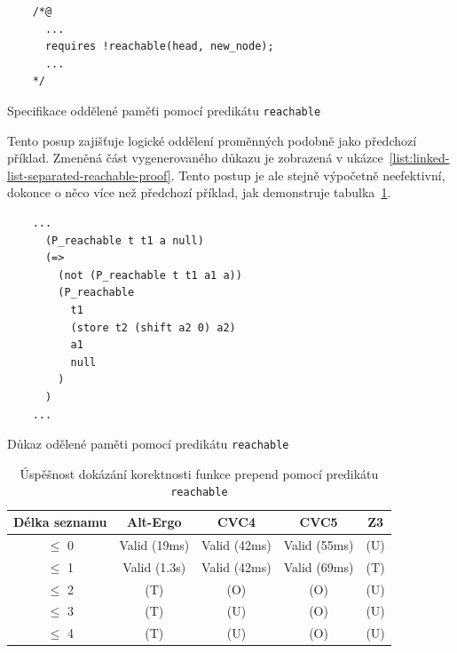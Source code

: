 \begin{listing}[H]
    \begin{verbatim}
    /*@
      ...
      requires !reachable(head, new_node);
      ...
    */
    \end{verbatim}
    \caption{Specifikace oddělené paměťi pomocí predikátu \texttt{reachable}}
    \label{list:linked-list-separated-reachable}
\end{listing}

Tento posup zajišťuje logické oddělení proměnných podobně jako předchozí příklad.
Zmeněná část vygenerovaného důkazu je zobrazená v ukázce~\ref{list:linked-list-separated-reachable-proof}.
Tento postup je ale stejně výpočetně neefektivní, dokonce o něco více než předchozí příklad,
jak demonstruje tabulka~\ref{tab:prepend-smt-success-reachable}.

\begin{listing}[H]
    \begin{verbatim}
    ...
      (P_reachable t t1 a null)
      (=>
        (not (P_reachable t t1 a1 a))
        (P_reachable
          t1
          (store t2 (shift a2 0) a2)
          a1
          null
        )
      )
    ...
    \end{verbatim}
    \caption{Důkaz odělené paměti pomocí predikátu \texttt{reachable}}
    \label{list:linked-list-separated-reachable-proof}
\end{listing}

\begin{table}[H]
    \centering
    \begin{tabular}{|c|c|c|c|c|}
        \hline
        Délka seznamu & Alt-Ergo     & CVC4         & CVC5         & Z3  \\
        \hline
        $\leq$ 0      & Valid (19ms) & Valid (42ms) & Valid (55ms) & (U) \\
        $\leq$ 1      & Valid (1.3s) & Valid (42ms) & Valid (69ms) & (T) \\
        $\leq$ 2      & (T)          & (O)          & (O)          & (U) \\
        $\leq$ 3      & (T)          & (U)          & (O)          & (U) \\
        $\leq$ 4      & (T)          & (U)          & (O)          & (U) \\
        \hline
    \end{tabular}
    \caption{Úspěšnost dokázání korektnosti funkce prepend pomocí predikátu \texttt{reachable}}
    \label{tab:prepend-smt-success-reachable}
\end{table}

